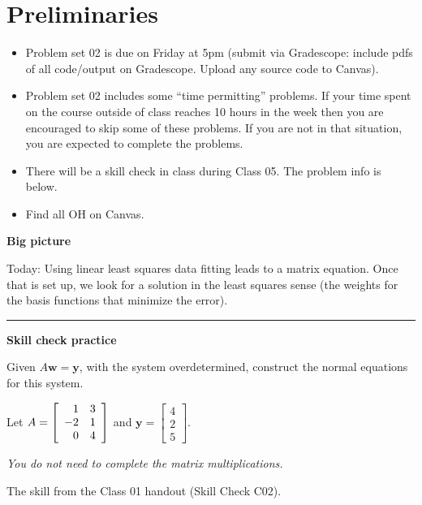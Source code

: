 \documentclass[12pt,letterpaper,noanswers]{exam}
\newcommand{\vc}[1]{\boldsymbol{#1}}
\begin{document}
 \pdfpageheight 11in 
  \pdfpagewidth 8.5in

\noindent 



\section{Preliminaries}
\begin{itemize}
\itemsep0pt
\item Problem set 02 is due on Friday at 5pm (submit via Gradescope: include pdfs of all code/output on Gradescope.  Upload any source code to Canvas).
\item Problem set 02 includes some ``time permitting'' problems.  If your time spent on the course outside of class reaches 10 hours in the week then you are encouraged to skip some of these problems.  If you are not in that situation, you are expected to complete the problems.
\item There will be a skill check in class during Class 05.  The problem info is below.
\item Find all OH on Canvas.
\end{itemize}



\noindent\textbf{Big picture}

Today: Using linear least squares data fitting leads to a matrix equation.  Once that is set up, we look for a solution in the least squares sense (the weights for the basis functions that minimize the error).

\vspace{0.2cm}
\hrule
\vspace{0.2cm}

\noindent \textbf{Skill check practice}
\begin{questions}
\item Given $A\vc{w} = \vc{y}$, with the system overdetermined, construct the normal equations for this system.

Let $A = \left[\begin{array}{r r}
1 & 3 \\
-2 & 1 \\
0 & 4
\end{array}\right]$ and $\vc{y} =  \left[\begin{array}{r}
4 \\ 2 \\ 5 \end{array}\right]$.  

\emph{You do not need to complete the matrix multiplications.}
\item The skill from the Class 01 handout (Skill Check C02).
\end{questions}
\end{document}

